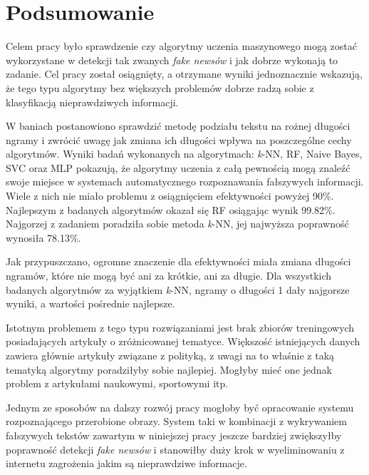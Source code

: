 \chapter{Podsumowanie}
Celem pracy było sprawdzenie czy algorytmy uczenia maszynowego mogą zostać wykorzystane
w detekcji tak zwanych \textit{fake newsów} i jak dobrze wykonają to zadanie. Cel pracy został osiągnięty,
a otrzymane wyniki jednoznacznie wskazują, że tego typu algorytmy bez większych problemów dobrze 
radzą sobie z klasyfikacją nieprawdziwych informacji.


W baniach postanowiono sprawdzić metodę podziału tekstu na rożnej długości ngramy i zwrócić uwagę 
jak zmiana ich długości wpływa na poszczególne cechy algorytmów.
Wyniki badań wykonanych na algorytmach: \textit{k}-NN, RF, Naive Bayes,
SVC oraz MLP pokazują, że algorytmy uczenia z całą pewnością mogą znaleźć swoje miejsce w systemach
automatycznego rozpoznawania fałszywych informacji. Wiele z nich nie miało problemu z osiągnięciem 
efektywności powyżej 90\%. Najlepszym z badanych algorytmów okazał się RF osiągając
wynik 99.82\%. Najgorzej z zadaniem poradziła sobie metoda \textit{k}-NN, jej najwyższa 
poprawność wynosiła 78.13\%.

Jak przypuszczano, ogromne znaczenie dla efektywności
miała zmiana długości ngramów, które nie mogą być ani za krótkie, ani za długie.
Dla wszystkich badanych algorytmów za wyjątkiem \textit{k}-NN, ngramy o długości 1 dały najgorsze wyniki, a wartości
pośrednie najlepsze.

Istotnym problemem z tego typu rozwiązaniami jest brak zbiorów treningowych posiadających 
artykuły o zróżnicowanej tematyce. Większość istniejących danych zawiera głównie artykuły związane z 
polityką, z uwagi na to właśnie z taką tematyką algorytmy poradziłyby sobie najlepiej. Mogłyby mieć one jednak problem 
z artykułami naukowymi, sportowymi itp.

Jednym ze sposobów na dalszy rozwój pracy mogłoby być opracowanie systemu rozpoznającego 
przerobione obrazy. System taki w kombinacji z wykrywaniem fałszywych tekstów zawartym
w niniejszej pracy jeszcze bardziej zwiększyłby poprawność detekcji \textit{fake newsów} i stanowiłby 
duży krok w wyeliminowaniu z internetu zagrożenia jakim są nieprawdziwe informacje.
